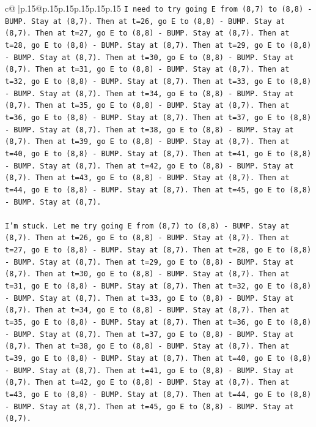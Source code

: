 \documentclass{article}
\begin{document}
{\begin{supertabular}{c@{$\;$}|p{.15\linewidth}@{}p{.15\linewidth}p{.15\linewidth}p{.15\linewidth}p{.15\linewidth}p{.15\linewidth}}
{{{\texttt{I need to try going E from (8,7) to (8,8) {-} BUMP. Stay at (8,7). Then at t=26, go E to (8,8) {-} BUMP. Stay at (8,7). Then at t=27, go E to (8,8) {-} BUMP. Stay at (8,7). Then at t=28, go E to (8,8) {-} BUMP. Stay at (8,7). Then at t=29, go E to (8,8) {-} BUMP. Stay at (8,7). Then at t=30, go E to (8,8) {-} BUMP. Stay at (8,7). Then at t=31, go E to (8,8) {-} BUMP. Stay at (8,7). Then at t=32, go E to (8,8) {-} BUMP. Stay at (8,7). Then at t=33, go E to (8,8) {-} BUMP. Stay at (8,7). Then at t=34, go E to (8,8) {-} BUMP. Stay at (8,7). Then at t=35, go E to (8,8) {-} BUMP. Stay at (8,7). Then at t=36, go E to (8,8) {-} BUMP. Stay at (8,7). Then at t=37, go E to (8,8) {-} BUMP. Stay at (8,7). Then at t=38, go E to (8,8) {-} BUMP. Stay at (8,7). Then at t=39, go E to (8,8) {-} BUMP. Stay at (8,7). Then at t=40, go E to (8,8) {-} BUMP. Stay at (8,7). Then at t=41, go E to (8,8) {-} BUMP. Stay at (8,7). Then at t=42, go E to (8,8) {-} BUMP. Stay at (8,7). Then at t=43, go E to (8,8) {-} BUMP. Stay at (8,7). Then at t=44, go E to (8,8) {-} BUMP. Stay at (8,7). Then at t=45, go E to (8,8) {-} BUMP. Stay at (8,7).} \\
\\ 
\texttt{I'm stuck. Let me try going E from (8,7) to (8,8) {-} BUMP. Stay at (8,7). Then at t=26, go E to (8,8) {-} BUMP. Stay at (8,7). Then at t=27, go E to (8,8) {-} BUMP. Stay at (8,7). Then at t=28, go E to (8,8) {-} BUMP. Stay at (8,7). Then at t=29, go E to (8,8) {-} BUMP. Stay at (8,7). Then at t=30, go E to (8,8) {-} BUMP. Stay at (8,7). Then at t=31, go E to (8,8) {-} BUMP. Stay at (8,7). Then at t=32, go E to (8,8) {-} BUMP. Stay at (8,7). Then at t=33, go E to (8,8) {-} BUMP. Stay at (8,7). Then at t=34, go E to (8,8) {-} BUMP. Stay at (8,7). Then at t=35, go E to (8,8) {-} BUMP. Stay at (8,7). Then at t=36, go E to (8,8) {-} BUMP. Stay at (8,7). Then at t=37, go E to (8,8) {-} BUMP. Stay at (8,7). Then at t=38, go E to (8,8) {-} BUMP. Stay at (8,7). Then at t=39, go E to (8,8) {-} BUMP. Stay at (8,7). Then at t=40, go E to (8,8) {-} BUMP. Stay at (8,7). Then at t=41, go E to (8,8) {-} BUMP. Stay at (8,7). Then at t=42, go E to (8,8) {-} BUMP. Stay at (8,7). Then at t=43, go E to (8,8) {-} BUMP. Stay at (8,7). Then at t=44, go E to (8,8) {-} BUMP. Stay at (8,7). Then at t=45, go E to (8,8) {-} BUMP. Stay at (8,7).} \\
\\ 
}}}
\end{supertabular}}
\end{document}

